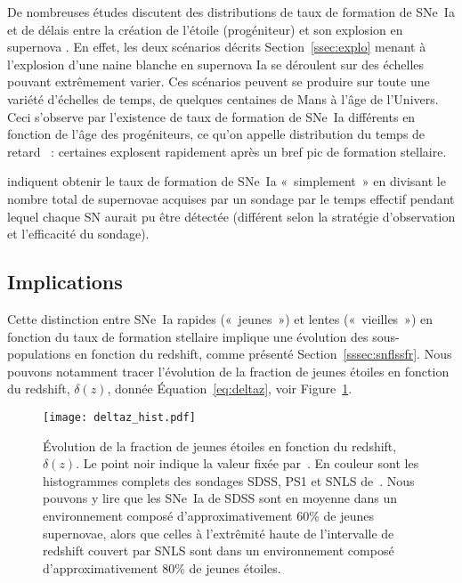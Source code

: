 \documentclass[../main/main.tex]{subfiles}
\begin{document}
De nombreuses études discutent des distributions de taux de formation de SNe~Ia
et de délais entre la création de l'étoile (progéniteur) et son explosion en
supernova \citep[par exemple,][]{mannucci2005, scannapieco2005, sullivan2006,
smith2012, childress2014, maoz2014}. En effet, les deux scénarios décrits
Section~\ref{ssec:explo} menant à l'explosion d'une naine blanche en supernova
Ia se déroulent sur des échelles pouvant extrêmement varier. Ces scénarios
peuvent se produire sur toute une variété d'échelles de temps, de quelques
centaines de \si{Mans} à l'âge de l'Univers. Ceci s'observe par l'existence de
taux de formation de SNe~Ia différents en fonction de l'âge des progéniteurs, ce
qu'on appelle distribution du temps de retard \citep[DTD en anglais pour Delay
Time Distribution, voir][]{mannucci2006}~: certaines explosent rapidement après
un bref pic de formation stellaire.

\cite{maoz2012} indiquent obtenir le taux de formation de SNe~Ia «~simplement~»
en divisant le nombre total de supernovae acquises par un sondage par le temps
effectif pendant lequel chaque SN aurait pu être détectée (différent selon la
stratégie d'observation et l'efficacité du sondage).


\subsection{Implications}\label{ssec:ageimpl}

Cette distinction entre SNe~Ia rapides («~jeunes~») et lentes («~vieilles~») en
fonction du taux de formation stellaire implique une évolution des
sous-populations en fonction du redshift, comme présenté
Section~\ref{sssec:snflssfr}. Nous pouvons notamment tracer l'évolution de la
fraction de jeunes étoiles en fonction du redshift, $\delta(z)$, donnée
Équation~\ref{eq:deltaz}, voir Figure~\ref{fig:deltaz}.

\begin{figure}[ht]
    \centering
    \texttt{[image: deltaz\_hist.pdf]}
    \caption[Évolution de la fraction de jeunes étoiles en fonction du redshift,
    $\delta(z)$.]{Évolution de la fraction de jeunes étoiles en fonction du
        redshift, $\delta(z)$. Le point noir indique la valeur fixée
        par~\cite{rigault2020}. En couleur sont les histogrammes complets des
    sondages SDSS, PS1 et SNLS de~\cite{scolnic2018}. Nous pouvons y lire que
les SNe~Ia de SDSS sont en moyenne dans un environnement composé
d'approximativement 60\% de jeunes supernovae, alors que celles à l'extrêmité
haute de l'intervalle de redshift couvert par SNLS sont dans un environnement
composé d'approximativement 80\% de jeunes étoiles.}
    \label{fig:deltaz}
\end{figure}
\end{document}
